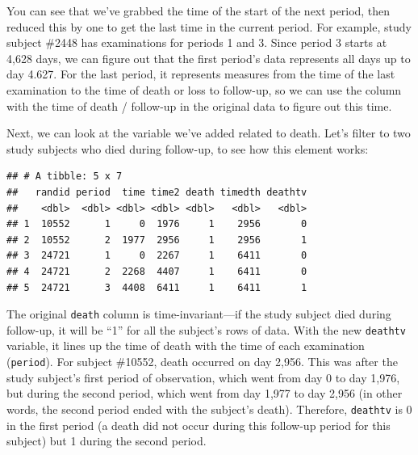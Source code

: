\documentclass[
]{book}
\newenvironment{Shaded}{\begin{snugshade}}{\end{snugshade}}
\newcommand{\DecValTok}[1]{\textcolor[rgb]{0.00,0.00,0.81}{#1}}
\newcommand{\KeywordTok}[1]{\textcolor[rgb]{0.13,0.29,0.53}{\textbf{#1}}}
\newcommand{\NormalTok}[1]{#1}
\newcommand{\OperatorTok}[1]{\textcolor[rgb]{0.81,0.36,0.00}{\textbf{#1}}}
\newcommand{\StringTok}[1]{\textcolor[rgb]{0.31,0.60,0.02}{#1}}
\begin{document}
You can see that we've grabbed the time of the start of the next period, then reduced this by one to get the last time in the current period. For example, study subject \#2448 has examinations for periods 1 and 3. Since period 3 starts at 4,628 days, we can figure out that the first period's data represents all days up to day 4.627. For the last period, it represents measures from the time of the last examination to the time of death or loss to follow-up, so we can use the column with the time of death / follow-up in the original data to figure out this time.

Next, we can look at the variable we've added related to death. Let's filter to two study subjects who died during follow-up, to see how this element works:

\begin{Shaded}
\end{Shaded}

\begin{verbatim}
## # A tibble: 5 x 7
##   randid period  time time2 death timedth deathtv
##    <dbl>  <dbl> <dbl> <dbl> <dbl>   <dbl>   <dbl>
## 1  10552      1     0  1976     1    2956       0
## 2  10552      2  1977  2956     1    2956       1
## 3  24721      1     0  2267     1    6411       0
## 4  24721      2  2268  4407     1    6411       0
## 5  24721      3  4408  6411     1    6411       1
\end{verbatim}

The original \texttt{death} column is time-invariant---if the study subject died during follow-up, it will be ``1'' for all the subject's rows of data. With the new \texttt{deathtv} variable, it lines up the time of death with the time of each examination (\texttt{period}). For subject \#10552, death occurred on day 2,956. This was after the study subject's first period of observation, which went from day 0 to day 1,976, but during the second period, which went from day 1,977 to day 2,956 (in other words, the second period ended with the subject's death). Therefore, \texttt{deathtv} is 0 in the first period (a death did not occur during this follow-up period for this subject) but 1 during the second period.
\end{document}

